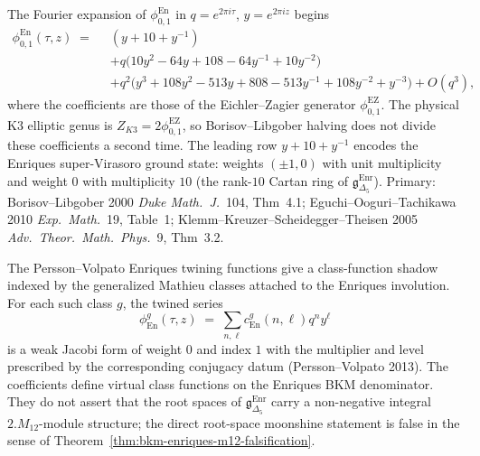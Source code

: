 \begin{remark}
\label{rem:dcy-enriques-fourier}
The Fourier expansion of $\phi^{\mathrm{En}}_{0,1}$ in
$q = e^{2\pi i\tau}$, $y = e^{2\pi i z}$ begins
\begin{align*}
 \phi^{\mathrm{En}}_{0,1}(\tau,z)
 \;=\;\;&
 (y + 10 + y^{-1})
 \\
 &+ q\bigl(10 y^2 - 64 y + 108 -64 y^{-1} + 10 y^{-2}\bigr)
\\
 &+ q^2\bigl(y^3 + 108y^2 - 513y + 808 -513y^{-1}
 +108y^{-2}+y^{-3}\bigr)
 + O(q^3),
\end{align*}
where the coefficients are those of the Eichler--Zagier generator
\(\phi^{\mathrm{EZ}}_{0,1}\). The physical K3 elliptic genus is
\(Z_{K3}=2\phi^{\mathrm{EZ}}_{0,1}\), so Borisov--Libgober halving
does not divide these coefficients a second time. The leading row
$y + 10 + y^{-1}$ encodes the
Enriques super-Virasoro ground state: weights $(\pm 1, 0)$ with
unit multiplicity and weight $0$ with multiplicity $10$ (the
rank-$10$ Cartan ring of $\mathfrak{g}_{\Delta_5}^{\mathrm{Enr}}$).
Primary: Borisov--Libgober 2000 \emph{Duke Math.~J.}~104, Thm~4.1;
Eguchi--Ooguri--Tachikawa 2010 \emph{Exp.~Math.}~19, Table~1;
Klemm--Kreuzer--Scheidegger--Theisen 2005
\emph{Adv.~Theor.~Math.~Phys.}~9, Thm~3.2.
\end{remark}

\begin{proposition}
\label{conj:dcy-enriques-m12-moonshine}
The Persson--Volpato Enriques twining functions give a class-function
shadow indexed by the generalized Mathieu classes attached to the
Enriques involution. For each such class $g$, the twined series
\[
 \phi^g_{\mathrm{En}}(\tau, z)
 \;=\;
 \sum_{n,\ell} c^g_{\mathrm{En}}(n,\ell)q^n y^\ell
\]
is a weak Jacobi form of weight $0$ and index $1$ with the multiplier
and level prescribed by the corresponding conjugacy datum
(Persson--Volpato 2013). The coefficients define virtual class
functions on the Enriques BKM denominator. They do not assert that the
root spaces of $\mathfrak{g}_{\Delta_5}^{\mathrm{Enr}}$ carry a
non-negative integral $2.M_{12}$-module structure; the direct
root-space moonshine statement is false in the sense of
Theorem~\ref{thm:bkm-enriques-m12-falsification}.
\end{proposition}


